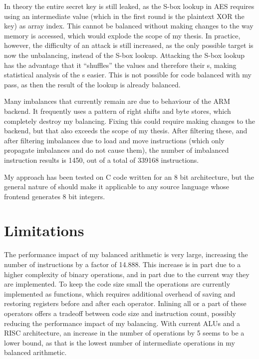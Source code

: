 In theory the entire secret key is still leaked, as the S-box lookup in AES requires using an intermediate value (which in the first round is the plaintext XOR the key) as array index.
This cannot be balanced without making changes to the way memory is accessed, which would explode the scope of my thesis.
In practice, however, the difficulty of an attack is still increased, as the only possible target is now the unbalancing, instead of the S-box lookup.
Attacking the S-box lookup has the advantage that it ``shuffles'' the values and therefore their \hammingw{}s, making statistical analysis of the \hammingw{}s easier.
This is not possible for code balanced with my pass, as then the result of the lookup is already balanced.

Many imbalances that currently remain are due to behaviour of the \llvm{} ARM backend.
It frequently uses a pattern of right shifts and byte stores, which completely destroy my balancing.
Fixing this could require making changes to the backend, but that also exceeds the scope of my thesis.
After filtering these, and after filtering imbalances due to load and move instructions (which only propagate imbalances and do not cause them), the number of imbalanced instruction results is 1450, out of a total of 339168 instructions.

My approach has been tested on C code written for an 8 bit architecture, but the general nature of \llvm{} should make it applicable to any source language whose frontend generates 8 bit integers.

\section{Limitations}
The performance impact of my balanced arithmetic is very large, increasing the number of instructions by a factor of 14.888.
This increase is in part due to a higher complexity of binary operations, and in part due to the current way they are implemented.
To keep the code size small the operations are currently implemented as functions, which requires additional overhead of saving and restoring registers before and after each operator.
Inlining all or a part of these operators offers a tradeoff between code size and instruction count, possibly reducing the performance impact of my balancing.
With current ALUs and a RISC architecture, an increase in the number of operations by 5 seems to be a lower bound, as that is the lowest number of intermediate operations in my balanced arithmetic.

